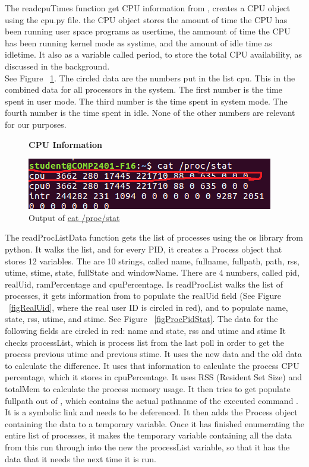 \documentclass[12pt]{article}
\begin{document}
The readcpuTimes function get CPU information from , creates a CPU object using the cpu.py file. the CPU object stores the amount of time the CPU has been running user space programs as usertime, the ammount of time the CPU has been running kernel mode as systime, and the amount of idle time as idletime.
It also as a variable called period, to store the total CPU availability, as discussed in the background.\\
See Figure ~\ref{figCPUInfo}.
The circled data are the numbers put in the list cpu.
This in the combined data for all processors in the system.
The first number is the time spent in user mode.
The third number is the time spent in system mode.
The fourth number is the time spent in idle.
None of the other numbers are relevant for our purposes.\\
\begin{figure}[h]
	\centering
	\textbf{CPU Information}\par\medskip
	\includegraphics{totalCPU}
	\caption{Output of \url{cat /proc/stat}}
	\label{figCPUInfo}
\end{figure}
The readProcListData function gets the list of processes using the os library from python. It walks the list, and for every PID, it creates a Process object that stores 12 variables. The are 10 strings, called name, fullname, fullpath, path, rss, utime, stime, state, fullState and windowName. There are 4 numbers, called pid, realUid, ramPercentage and cpuPercentage. Is readProcList walks the list of processes, it gets information from  to populate the realUid field (See Figure ~\ref{figRealUid}, where the real user ID is circled in red), and  to populate name, state, rss, utime, and stime. See Figure ~\ref{figProcPidStat}. The data for the following fields are circled in red: name and state, rss and utime and stime It checks processList, which is process list from the last poll in order to get the process previous utime and previous stime. It uses the new data and the old data to calculate the difference. It uses that information to calculate the process CPU percentage, which it stores in cpuPercentage. 
It uses RSS (Resident Set Size) and totalMem to calculate the process memory usage.
It then tries to get populate fullpath out of , which contains the actual pathname of the executed command \cite{manProc}. It is a symbolic link and needs to be deferenced. It then adds the Process object containing the data to a temporary variable. Once it has finished enumerating the entire list of processes, it makes the temporary variable containing all the data from this run through into the new the processList variable, so that it has the data that it needs the next time it is run.\\
\end{document}
